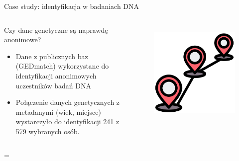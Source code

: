   
  \begin{frame}{Case study: identyfikacja w badaniach DNA}
  \begin{columns}[c]
      \begin{alertblock}{Czy dane genetyczne są naprawdę anonimowe?}
        \begin{itemize}
          \item Dane z publicznych baz (GEDmatch) wykorzystane do identyfikacji anonimowych uczestników badań DNA
          \item Połączenie danych genetycznych z metadanymi (wiek, miejsce) wystarczyło do identyfikacji 241 z 579 wybranych osób.\cite{DNA_LEAK}
        \end{itemize}
      \end{alertblock}
      \begin{figure}
        \centering
        \includegraphics[height=0.45\textheight]{images/routing.png}
        \label{fig:dnaCase}
      \end{figure}
  \end{columns}=
  \end{frame}
  
  
